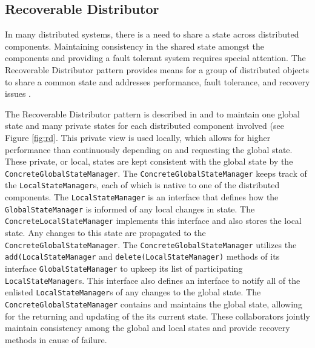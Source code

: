 \subsection{Recoverable Distributor}

In many distributed systems, there is a need to share a state across distributed
components. Maintaining consistency in the shared state amongst the components
and providing a fault tolerant system requires special attention. The
Recoverable Distributor pattern provides means for a group of distributed
objects to share a common state and addresses performance, fault tolerance, and
recovery issues \cite{RD1}. 

The Recoverable Distributor pattern is described in \cite{RD1} and \cite{RD2} to
maintain one global state and many private states for each distributed component
involved (see Figure \ref{fig:rd}. This private view is used locally, which
allows for higher performance than continuously depending on and requesting the
global state. These private, or local, states are kept consistent with the
global state by the \texttt{ConcreteGlobalStateManager}. The
\texttt{ConcreteGlobalStateManager} keeps track of the
\texttt{LocalStateManager}s, each of which is native to one of the distributed
components. The \texttt{LocalStateManager} is an interface that defines how the
\texttt{GlobalStateManager} is informed of any local changes in state. The
\texttt{ConcreteLocalStateManager} implements this interface and also stores the
local state. Any changes to this state are propagated to the
\texttt{ConcreteGlobalStateManager}. The \texttt{ConcreteGlobalStateManager}
utilizes the \texttt{add(LocalStateManager} and
\texttt{delete(LocalStateManager)} methods of its interface
\texttt{GlobalStateManager} to upkeep its list of participating
\texttt{LocalStateManager}s. This interface also defines an interface to notify
all of the enlisted \texttt{LocalStateManager}s of any changes to the global
state. The \texttt{ConcreteGlobalStateManager} contains and maintains the global
state, allowing for the returning and updating of the its current state. These
collaborators jointly maintain consistency among the global and local states and
provide recovery methods in cause of failure.

